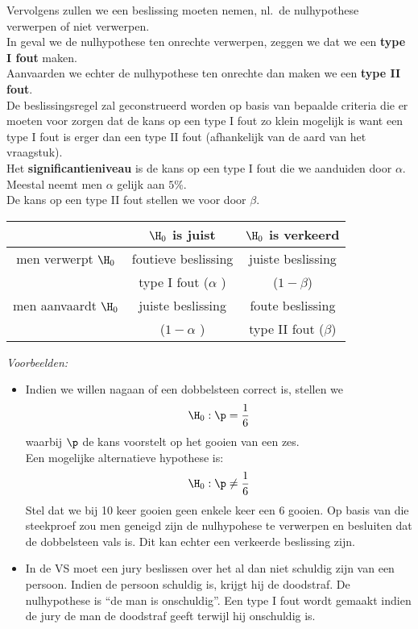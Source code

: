 {Vervolgens zullen we een beslissing moeten nemen, nl.\ de nulhypothese verwerpen of niet verwerpen. \\
In geval we de nulhypothese ten onrechte verwerpen, zeggen we dat we een 
{\bf type I fout} maken.\\ Aanvaarden we echter de nulhypothese ten onrechte 
dan maken we een {\bf type II fout}.\\
De beslissingsregel zal geconstrueerd worden op basis van bepaalde criteria die er moeten voor zorgen dat  de  kans op een type I fout zo klein mogelijk is want een type I fout is erger dan een type II fout (afhankelijk van de aard van het vraagstuk).\\
Het {\bf  significantieniveau} is de kans op een type I fout die we aanduiden  door $\alpha$. Meestal neemt men $\alpha$ gelijk aan $5\%$. \\De kans op een type II fout stellen we voor door $\beta$. 

\begin{center}
\begin{tabular}{|c|c|c|}
\hline
 & $\H_0$ is juist & $\H_0$ is verkeerd\\
 \hline
 men verwerpt $\H_0$ & foutieve beslissing & juiste beslissing\\
                        & type I fout  ($\alpha$ )& ($1-\beta$) \\
\hline
men aanvaardt $\H_0$ & juiste beslissing & foute beslissing\\
                        &    ($1-\alpha$ )         & type II fout ($\beta$)\\
\hline
\end{tabular} 
\end{center} 

{\em Voorbeelden:}
\begin{itemize}
 \item Indien we willen nagaan of een dobbelsteen correct is, stellen  we  $$\H_0: \p=\frac{1}{6}$$
waarbij $\p$ de kans voorstelt op het gooien van een zes. \\Een mogelijke alternatieve hypothese is:
$$\H_0: \p\not=\frac{1}{6}$$
Stel dat we bij 10 keer gooien geen enkele keer een 6 gooien. Op basis van die steekproef zou men geneigd zijn de nulhypohese te verwerpen en besluiten dat de dobbelsteen vals is. Dit kan echter een verkeerde beslissing zijn.
\item In de VS moet een jury  beslissen over het al dan niet schuldig zijn van een persoon. Indien de persoon schuldig is, krijgt hij de doodstraf. De  nulhypothese is  ``de man is onschuldig''. Een type I fout wordt gemaakt indien de jury de man de doodstraf geeft terwijl hij onschuldig is.
\end{itemize}


}
